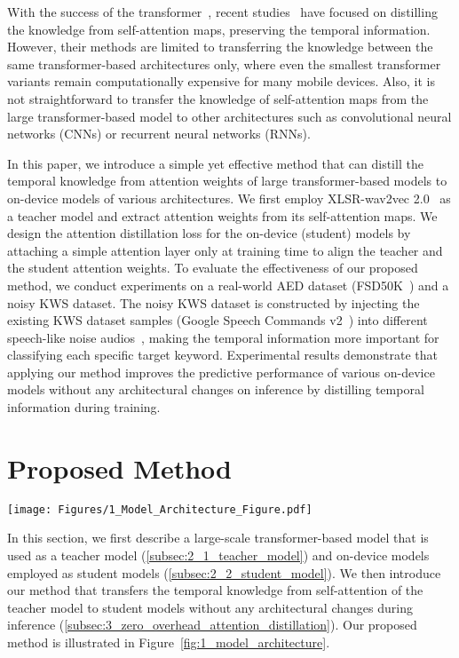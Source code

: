 \documentclass{article}
\begin{document}
With the success of the transformer~\cite{vaswani2017attention}, recent studies~\cite{Zagoruyko2017pay,Chang2020IntraUtteranceSP} have focused on distilling the knowledge from self-attention maps, preserving the temporal information.
However, their methods are limited to transferring the knowledge between the same transformer-based architectures only, where even the smallest transformer variants remain computationally expensive for many mobile devices.
Also, it is not straightforward to transfer the knowledge of self-attention maps from the large transformer-based model to other architectures such as convolutional neural networks (CNNs) or recurrent neural networks (RNNs).

In this paper, we introduce a simple yet effective method that can distill the temporal knowledge from attention weights of large transformer-based models to on-device models of various architectures.
We first employ XLSR-wav2vec 2.0~\cite{conneau2020unsupervised} as a teacher model and extract attention weights from its self-attention maps.
We design the attention distillation loss for the on-device (student) models by attaching a simple attention layer only at training time to align the teacher and the student attention weights.
To evaluate the effectiveness of our proposed method, we conduct experiments on a real-world AED dataset (FSD50K~\cite{fonseca2020fsd50k}) and a noisy KWS dataset.
The noisy KWS dataset is constructed by injecting the existing KWS dataset samples (Google Speech Commands v2~\cite{speechcommandsv2}) into different speech-like noise audios~\cite{audioset17}, making the temporal information more important for classifying each specific target keyword.
Experimental results demonstrate that applying our method improves the predictive performance of various on-device models without any architectural changes on inference by distilling temporal information during training.

 \section{Proposed Method}\label{sec:2_proposed_method}
\begin{figure*}[t] \centering
\texttt{[image: Figures/1\_Model\_Architecture\_Figure.pdf]}
\caption{
Illustration of our proposed method.
}
\label{fig:1_model_architecture}
\end{figure*} In this section, we first describe a large-scale transformer-based model that is used as a teacher model (\ref{subsec:2_1_teacher_model}) and on-device models employed as student models (\ref{subsec:2_2_student_model}).
We then introduce our method that transfers the temporal knowledge from self-attention of the teacher model to student models without any architectural changes during inference (\ref{subsec:3_zero_overhead_attention_distillation}).
Our proposed method is illustrated in Figure~\ref{fig:1_model_architecture}.
\end{document}
